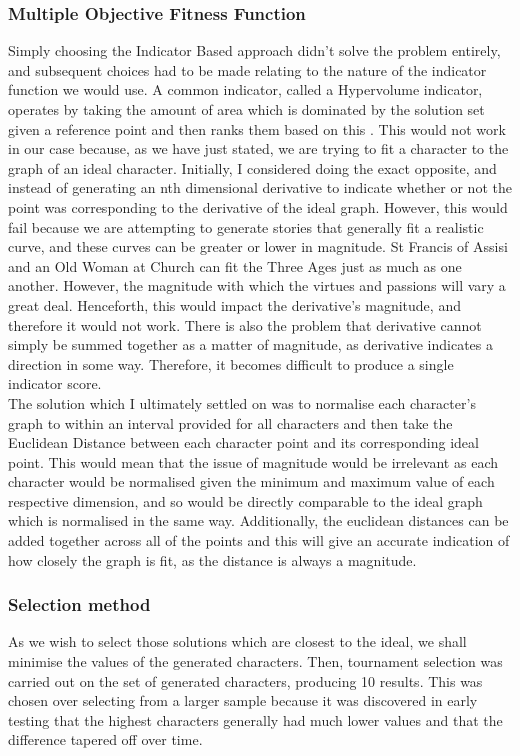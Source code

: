 \documentclass[12pt]{article}
\begin{document}
\subsubsection{Multiple Objective Fitness Function}
Simply choosing the Indicator Based approach didn't solve the problem entirely, and subsequent choices had to be made relating to the nature of the indicator function we would use. A common indicator, called a Hypervolume indicator, operates by taking the amount of area which is dominated by the solution set given a reference point and then ranks them based on this \cite{AchievementScalarazingIndicatorBased}. This would not work in our case because, as we have just stated, we are trying to fit a character to the graph of an ideal character. Initially, I considered doing the exact opposite, and instead of generating an nth dimensional derivative to indicate whether or not the point was corresponding to the derivative of the ideal graph. However, this would fail because we are attempting to generate stories that generally fit a realistic curve, and these curves can be greater or lower in magnitude. St Francis of Assisi and an Old Woman at Church can fit the Three Ages just as much as one another. However, the magnitude with which the virtues and passions will vary a great deal. Henceforth, this would impact the derivative's magnitude, and therefore it would not work. There is also the problem that derivative cannot simply be summed together as a matter of magnitude, as derivative indicates a direction in some way. Therefore, it becomes difficult to produce a single indicator score.  \\

The solution which I ultimately settled on was to normalise each character's graph to within an interval provided for all characters and then take the Euclidean Distance between each character point and its corresponding ideal point. This would mean that the issue of magnitude would be irrelevant as each character would be normalised given the minimum and maximum value of each respective dimension, and so would be directly comparable to the ideal graph which is normalised in the same way. Additionally, the euclidean distances can be added together across all of the points and this will give an accurate indication of how closely the graph is fit, as the distance is always a magnitude. 

\subsubsection{Selection method}
As we wish to select those solutions which are closest to the ideal, we shall minimise the values of the generated characters. Then, tournament selection was carried out on the set of generated characters, producing 10 results. This was chosen over selecting from a larger sample because it was discovered in early testing that the highest characters generally had much lower values and that the difference tapered off over time. 
\end{document}
